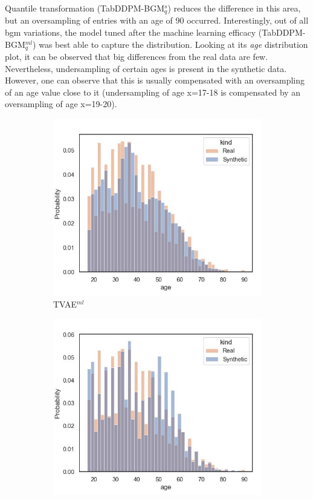 Quantile transformation (TabDDPM-BGM$^{s}_q$) reduces the difference in this area, but an oversampling of entries with an age of 90 occurred.
Interestingly, out of all \gls{bgm} variations, the \gls{model} tuned after the machine learning efficacy (TabDDPM-BGM$^{ml}_q$) was best able to capture the distribution.
Looking at its \textit{age} distribution plot, it can be observed that big differences from the real data are few.
Nevertheless, undersampling of certain ages is present in the synthetic data.
However, one can observe that this is usually compensated with an oversampling of an age value close to it
(\eg undersampling of age x=17-18 is compensated by an oversampling of age x=19-20).\newpage


\begin{figure}[H]
	\centering
	\begin{subfigure}{0.3\textwidth}
		\centering
		\includegraphics[width=\textwidth]{images/dist_age/tvae.jpg}
		\caption{TVAE$^{ml}$}
	\end{subfigure}
	\begin{subfigure}{0.3\textwidth}
		\centering
		\includegraphics[width=\textwidth]{images/dist_age/ctabgan.jpg}

\end{subfigure}
\end{figure}
